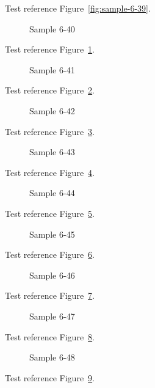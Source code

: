 Test reference Figure~\ref{fig:sample-6-39}.

\begin{figure}[tbhp]
\caption{Sample 6-40}
\label{fig:sample-6-40}
\end{figure}

Test reference Figure~\ref{fig:sample-6-40}.

\begin{figure}[tbhp]
\caption{Sample 6-41}
\label{fig:sample-6-41}
\end{figure}

Test reference Figure~\ref{fig:sample-6-41}.

\begin{figure}[tbhp]
\caption{Sample 6-42}
\label{fig:sample-6-42}
\end{figure}

Test reference Figure~\ref{fig:sample-6-42}.

\begin{figure}[tbhp]
\caption{Sample 6-43}
\label{fig:sample-6-43}
\end{figure}

Test reference Figure~\ref{fig:sample-6-43}.

\begin{figure}[tbhp]
\caption{Sample 6-44}
\label{fig:sample-6-44}
\end{figure}

Test reference Figure~\ref{fig:sample-6-44}.

\begin{figure}[tbhp]
\caption{Sample 6-45}
\label{fig:sample-6-45}
\end{figure}

Test reference Figure~\ref{fig:sample-6-45}.

\begin{figure}[tbhp]
\caption{Sample 6-46}
\label{fig:sample-6-46}
\end{figure}

Test reference Figure~\ref{fig:sample-6-46}.

\begin{figure}[tbhp]
\caption{Sample 6-47}
\label{fig:sample-6-47}
\end{figure}

Test reference Figure~\ref{fig:sample-6-47}.

\begin{figure}[tbhp]
\caption{Sample 6-48}
\label{fig:sample-6-48}
\end{figure}

Test reference Figure~\ref{fig:sample-6-48}.


